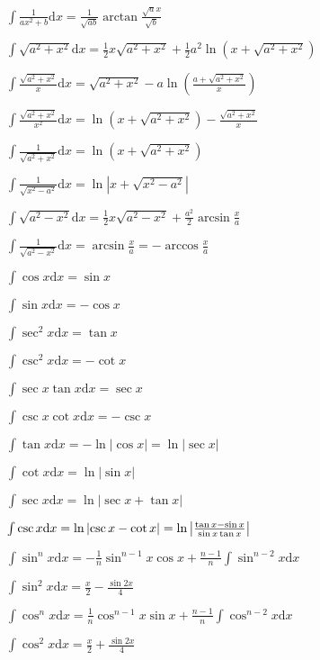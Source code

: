 \documentclass[9pt,landscape]{article}
\begin{document}
\begin{multicols}{3}
$ \int {\frac {1}{ax^{2}+b}}{\mbox{d}}x={\frac {1}{\sqrt {ab}}}\arctan {\frac {{\sqrt {a}}x}{\sqrt {b}}} $

$ \int {\sqrt {a^{2}+x^{2}}}{\mbox{d}}x={\frac {1}{2}}x{\sqrt {a^{2}+x^{2}}}+{\frac {1}{2}}a^{2}\ln \left(x+{\sqrt {a^{2}+x^{2}}}\right) $

$ \int {\frac {\sqrt {a^{2}+x^{2}}}{x}}{\mbox{d}}x={\sqrt {a^{2}+x^{2}}}-a\ln \left({\frac {a+{\sqrt {a^{2}+x^{2}}}}{x}}\right) $

$ \int {\frac {\sqrt {a^{2}+x^{2}}}{x^{2}}}{\mbox{d}}x=\ln \left(x+{\sqrt {a^{2}+x^{2}}}\right)-{\frac {\sqrt {a^{2}+x^{2}}}{x}} $

$ \int {\frac {1}{\sqrt {a^{2}+x^{2}}}}{\mbox{d}}x=\ln \left(x+{\sqrt {a^{2}+x^{2}}}\right) $

$ \int {\frac {1}{\sqrt {x^{2}-a^{2}}}}{\mbox{d}}x=\ln|x+{\sqrt {x^{2}-a^{2}}}| $

$ \int {\sqrt {a^{2}-x^{2}}}{\mbox{d}}x={\frac {1}{2}}x{\sqrt {a^{2}-x^{2}}}+{\frac {a^{2}}{2}}\arcsin {\frac {x}{a}} $

$ \int {\frac {1}{\sqrt {a^{2}-x^{2}}}}{\mbox{d}}x=\arcsin {\frac {x}{a}}=-\arccos {\frac {x}{a}} $

$ \int \cos x{\mbox{d}}x=\sin x $

$ \int \sin x{\mbox{d}}x=-\cos x $

$ \int \sec ^{2}x{\mbox{d}}x=\tan x $

$ \int \csc ^{2}x{\mbox{d}}x=-\cot x $

$ \int \sec x\tan x{\mbox{d}}x=\sec x $

$ \int \csc x\cot x{\mbox{d}}x=-\csc x $

$ \int \tan x{\mbox{d}}x=-\ln {\left|\cos {x}\right|}=\ln {\left|\sec x\right|} $

$ \int \cot x{\mbox{d}}x=\ln {\left|\sin x\right|} $

$ \int \sec x{\mbox{d}}x=\ln {\left|\sec x+\tan x\right|} $

$ \int \csc x{\mbox{d}}x=\ln {\left|\csc x-\cot x\right|}=\ln {\left|{\tan x-\sin x \over \sin x\tan x}\right|} $

$ \int \sin ^{n}x{\mbox{d}}x=-{\frac {1}{n}}\sin ^{n-1}x\cos x+{\frac {n-1}{n}}\int \sin ^{n-2}x{\mbox{d}}x\quad $

$ \int \sin ^{2}x{\mbox{d}}x={\frac {x}{2}}-{\frac {\sin {2x}}{4}} $

$ \int \cos ^{n}x{\mbox{d}}x={\frac {1}{n}}\cos ^{n-1}x\sin x+{\frac {n-1}{n}}\int \cos ^{n-2}x{\mbox{d}}x\quad $

$ \int \cos ^{2}x{\mbox{d}}x={\frac {x}{2}}+{\frac {\sin {2x}}{4}} $


\end{multicols}
\end{document}
